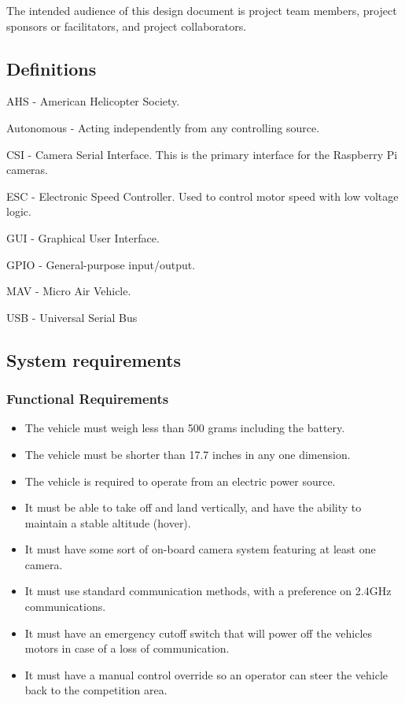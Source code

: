\documentclass[onecolumn, draftclsnofoot,10pt, compsoc]{IEEEtran}
\begin{document}
The intended audience of this design document is project team members, project sponsors or facilitators, and project collaborators.  

\subsection{Definitions} %
\begin{description}
		\item{AHS} -  American Helicopter Society.
        \item{Autonomous} -  Acting independently from any controlling source.
        \item{CSI} - Camera Serial Interface. This is the primary interface for the Raspberry Pi cameras. 
        \item{ESC} - Electronic Speed Controller. Used to control motor speed with low voltage logic. 
        \item{GUI} -  Graphical User Interface.
        \item{GPIO} - General-purpose input/output.
        \item{MAV} -  Micro Air Vehicle.
        \item{USB} - Universal Serial Bus
        
\end{description}     


\subsection{System requirements} 


\subsubsection{Functional Requirements}  

\begin{itemize}
\item The vehicle must weigh less than 500 grams including the battery.
\item The vehicle must be shorter than 17.7 inches in any one dimension. 
\item The vehicle is required to operate from an electric power source.
\item It must be able to take off and land vertically, and have the ability to maintain a stable altitude (hover).
\item It must have some sort of on-board camera system featuring at least one camera.
\item It must use standard communication methods, with a preference on 2.4GHz communications.
\item It must have an emergency cutoff switch that will power off the vehicles motors in case of a loss of communication.
\item It must have a manual control override so an operator can steer the vehicle back to the competition area. 
\end{itemize}
\end{document}
